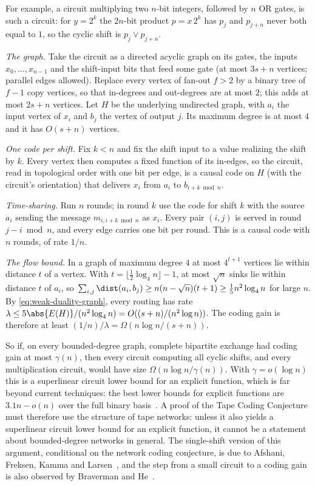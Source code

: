 For example, a circuit multiplying two $n$-bit integers, followed by $n$ OR gates, is such a circuit:
for $y=2^k$ the $2n$-bit product $p=x\,2^k$ has $p_j$ and $p_{j+n}$ never both equal to $1$, so the
cyclic shift is $p_j\vee p_{j+n}$.

\begin{informalproof}
\emph{The graph.} Take the circuit as a directed acyclic graph on its gates, the inputs $x_0,\dots,x_{n-1}$ and the shift-input bits that feed some gate (at most $3s+n$ vertices; parallel edges allowed). Replace
every vertex of fan-out $f>2$ by a binary tree of $f-1$ copy vertices, so that in-degrees and
out-degrees are at most $2$; this adds at most $2s+n$ vertices. Let $H$ be the underlying undirected
graph, with $a_i$ the input vertex of $x_i$ and $b_j$ the vertex of output $j$. Its maximum degree is
at most $4$ and it has $O(s+n)$ vertices.

\emph{One code per shift.} Fix $k<n$ and fix the shift input to a value realizing the shift by $k$.
Every vertex then computes a fixed function of its in-edges, so the circuit, read in topological order
with one bit per edge, is a causal code on $H$ (with the circuit's orientation) that delivers $x_i$ from
$a_i$ to $b_{i+k\bmod n}$.

\emph{Time-sharing.} Run $n$ rounds; in round $k$ use the code for shift $k$ with the source $a_i$ sending
the message $m_{i,i+k\bmod n}$ as $x_i$. Every pair $(i,j)$ is served in round $j-i\bmod n$, and every edge
carries one bit per round. This is a causal code with $n$ rounds, of rate $1/n$.

\emph{The flow bound.} In a graph of maximum degree $4$ at most $4^{t+1}$ vertices lie within distance $t$
of a vertex. With $t=\lfloor\tfrac12\log_4n\rfloor-1$, at most $\sqrt n$ sinks lie within distance $t$ of
$a_i$, so
$\sum_{i,j}\dist(a_i,b_j)\ge n(n-\sqrt n)(t+1)\ge\tfrac15n^2\log_4n$ for large $n$. By
\eqref{eq:weak-duality-graph}, every routing has rate $\lambda\le5\abs{E(H)}/(n^2\log_4n)=O((s+n)/(n^2\log n))$.
The coding gain is therefore at least $(1/n)/\lambda=\Omega(n\log n/(s+n))$.
\end{informalproof}

So if, on every bounded-degree graph, complete bipartite exchange had coding gain at most $\gamma(n)$,
then every circuit computing all cyclic shifts, and every multiplication circuit, would have size
$\Omega(n\log n/\gamma(n))$. With $\gamma=o(\log n)$ this is a superlinear circuit lower bound for an
explicit function, which is far beyond current techniques: the best lower bounds for explicit functions
are $3.1n-o(n)$ over the full binary basis~\cite{LiYang2022}. A proof of the Tape Coding Conjecture must
therefore use the structure of tape networks: unless it also yields a superlinear circuit lower bound for an
explicit function, it cannot be a statement about bounded-degree networks in general. The single-shift version of this argument, conditional on the network coding conjecture, is due
to Afshani, Freksen, Kamma and Larsen~\cite{AFKL2019}, and the step from a small circuit to a coding gain
is also observed by Braverman and He~\cite{BravermanHe2026}.

